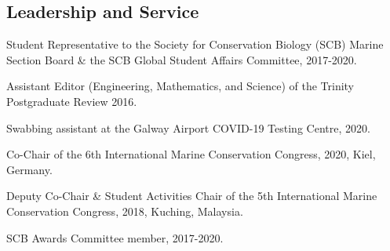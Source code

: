 \documentclass[a4paper]{deedy-resume} %
\begin{document}

\newpage %


\sectionspace


\begin{flushleft}

\sectionspace


\section{Leadership and Service} 


\begin{tightitemize}
\item Student Representative to the Society for Conservation Biology (SCB) Marine Section Board \& the SCB Global Student Affairs Committee, 2017-2020. 
\item Assistant Editor (Engineering, Mathematics, and Science) of the Trinity Postgraduate Review 2016.
\end{tightitemize}

\sectionspace

\begin{tightitemize}
\item Swabbing assistant at the Galway Airport COVID-19 Testing Centre, 2020.
\item Co-Chair of the 6th International Marine Conservation Congress, 2020, Kiel, Germany.
\item Deputy Co-Chair \& Student Activities Chair of the 5th International Marine Conservation Congress, 2018, Kuching, Malaysia.
\item SCB Awards Committee member, 2017-2020.
\end{tightitemize}

\sectionspace





\end{flushleft}
\end{document}
